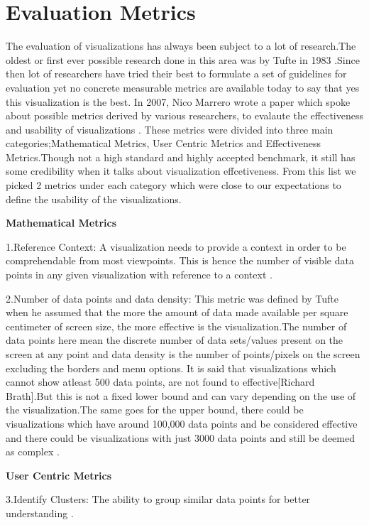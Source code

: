 \documentclass[double,12pt]{beavtex}
\begin{document}
\section{Evaluation Metrics}
The evaluation of visualizations has always been subject to a lot of research.The oldest or first ever possible research done in this area was by Tufte in 1983 \cite{tufte1983}.Since then lot of researchers have tried their best to formulate a set of guidelines for evaluation yet no concrete measurable metrics are available today to say that yes this visualization is the best. In 2007, Nico Marrero wrote a paper which spoke about possible metrics derived by various researchers, to evalaute the effectiveness and usability of visualizations \cite{nico2007}. These metrics were divided into three main categories;Mathematical Metrics, User Centric Metrics and Effectiveness Metrics.Though not a high standard and highly accepted benchmark, it still has some credibility when it talks about visualization effcetiveness. From this list we picked 2 metrics under each category which were close to our expectations to define the usability of the visualizations.


\textbf{Mathematical Metrics}

1.Reference Context: A visualization needs to provide a context in order to be comprehendable from most viewpoints. This is hence the number of visible data points in any given visualization with reference to a context \cite{brath1997}.

2.Number of data points and data density: This metric was defined by Tufte when he assumed that the more the amount of data made available per square centimeter of screen size, the more effective is the visualization.The number of data points here mean the discrete number of data sets/values present on the screen at any point and data density is the number of points/pixels on the screen excluding the borders and menu options. It is said that visualizations which cannot show atleast 500 data points, are not found to effective[Richard Brath].But this is not a fixed lower bound and can vary depending on the use of the visualization.The same goes for the upper bound, there could be visualizations which have around 100,000 data points and be considered effective and there could be visualizations with just 3000 data points and still be deemed as complex \cite{brath1997}.

\textbf{User Centric Metrics}

3.Identify Clusters: The ability to group similar data points for better understanding \cite{grins2001}.
\end{document}

